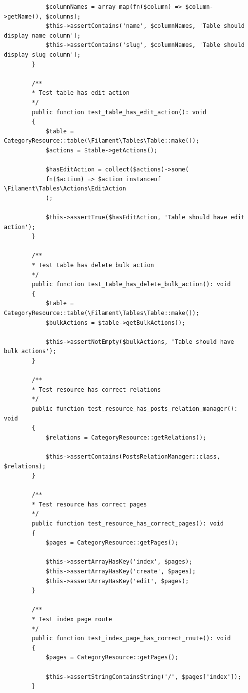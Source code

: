 \begin{verbatim}
            $columnNames = array_map(fn($column) => $column->getName(), $columns);
            $this->assertContains('name', $columnNames, 'Table should display name column');
            $this->assertContains('slug', $columnNames, 'Table should display slug column');
        }
        
        /**
        * Test table has edit action
        */
        public function test_table_has_edit_action(): void
        {
            $table = CategoryResource::table(\Filament\Tables\Table::make());
            $actions = $table->getActions();
            
            $hasEditAction = collect($actions)->some(
            fn($action) => $action instanceof \Filament\Tables\Actions\EditAction
            );
            
            $this->assertTrue($hasEditAction, 'Table should have edit action');
        }
        
        /**
        * Test table has delete bulk action
        */
        public function test_table_has_delete_bulk_action(): void
        {
            $table = CategoryResource::table(\Filament\Tables\Table::make());
            $bulkActions = $table->getBulkActions();
            
            $this->assertNotEmpty($bulkActions, 'Table should have bulk actions');
        }
        
        /**
        * Test resource has correct relations
        */
        public function test_resource_has_posts_relation_manager(): void
        {
            $relations = CategoryResource::getRelations();
            
            $this->assertContains(PostsRelationManager::class, $relations);
        }
        
        /**
        * Test resource has correct pages
        */
        public function test_resource_has_correct_pages(): void
        {
            $pages = CategoryResource::getPages();
            
            $this->assertArrayHasKey('index', $pages);
            $this->assertArrayHasKey('create', $pages);
            $this->assertArrayHasKey('edit', $pages);
        }
        
        /**
        * Test index page route
        */
        public function test_index_page_has_correct_route(): void
        {
            $pages = CategoryResource::getPages();
            
            $this->assertStringContainsString('/', $pages['index']);
        }
        

\end{verbatim}
